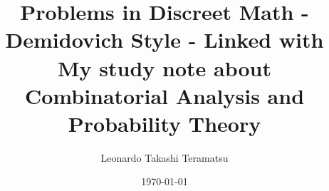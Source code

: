 \documentclass[a4paper, 12pt]{book}
\begin{document}
\title{Problems in Discreet Math - Demidovich Style - Linked with My study note about Combinatorial Analysis and Probability Theory}
\author{Leonardo Takashi Teramatsu}
\date{\today}

\maketitle

\tableofcontents
\newpage %



\end{document}
